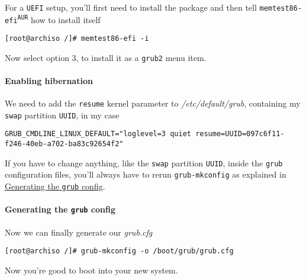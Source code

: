 \documentclass[9pt]{report}
\newenvironment{NOTE}
{\begin{tcolorbox}[colback=admonitionBG,coltitle=draculaFG,colframe=draculaBlue,colbacktitle=draculaBlue,title=NOTE]}
{\end{tcolorbox}}
\begin{document}
For a \texttt{UEFI} setup, you’ll first need to install the package and then tell \texttt{memtest86-efi\textsuperscript{\texttt{AUR}}} how to install itself


\begin{verbatim}
[root@archiso /]# memtest86-efi -i
\end{verbatim}

Now select option 3, to install it as a \texttt{grub2} menu item.



\newpage

\hypertarget{x-enabling-hibernation}{\paragraph{Enabling hibernation}}
We need to add the \texttt{resume} kernel parameter to \textit{/etc/default/grub}, containing my \texttt{swap} partition \texttt{UUID}, in my case


\begin{verbatim}
GRUB_CMDLINE_LINUX_DEFAULT="loglevel=3 quiet resume=UUID=097c6f11-f246-40eb-a702-ba83c92654f2"
\end{verbatim}

\begin{NOTE}
    If you have to change anything, like the \texttt{swap} partition \texttt{UUID}, inside the \texttt{grub} configuration files, you’ll always have to rerun \texttt{grub-mkconfig} as explained in \hyperlink{x-generating-the-grub-config}{Generating the \texttt{grub} config}.

\end{NOTE}
\hypertarget{x-generating-the-grub-config}{\paragraph{Generating the \texttt{grub} config}}
Now we can finally generate our \textit{grub.cfg}


\begin{verbatim}
[root@archiso /]# grub-mkconfig -o /boot/grub/grub.cfg
\end{verbatim}

Now you’re good to boot into your new system.



\newpage
\end{document}
